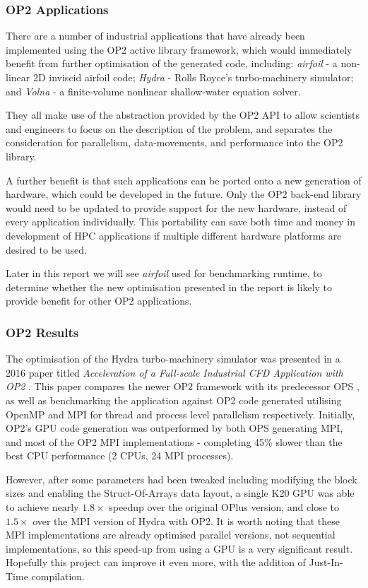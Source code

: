 \subsubsection{OP2 Applications}
There are a number of industrial applications that have already been implemented using the OP2 active library framework, which would immediately benefit from further optimisation of the generated code, including: \textit{airfoil} \cite{airfoil} - a non-linear 2D inviscid airfoil code; \textit{Hydra} \cite{hydra} - Rolls Royce’s turbo-machinery simulator; and \textit{Volna} \cite{volna} - a finite-volume nonlinear shallow-water equation solver.
\par
They all make use of the abstraction provided by the OP2 API to allow scientists and engineers to focus on the description of the problem, and separates the consideration for parallelism, data-movements, and performance into the OP2 library.
\par
A further benefit is that such applications can be ported onto a new generation of hardware, which could be developed in the future. Only the OP2 back-end library would need to be updated to provide support for the new hardware, instead of every application individually. This portability can save both time and money in development of HPC applications if multiple different hardware platforms are desired to be used.
\par
Later in this report we will see \textit{airfoil} used for benchmarking runtime, to determine whether the new optimisation presented in the report is likely to provide benefit for other OP2 applications.

\subsubsection{OP2 Results}
The optimisation of the Hydra turbo-machinery simulator was presented in a 2016 paper titled \textit{Acceleration of a Full-scale Industrial CFD Application with OP2} \cite{hydrapaper}. This paper compares the newer OP2 framework with its predecessor OPS \cite{ops}, as well as benchmarking the application against OP2 code generated utilising OpenMP \cite{OpenMP} and MPI \cite{MPI} for thread and process level parallelism respectively. Initially, OP2's GPU code generation was outperformed by both OPS generating MPI, and most of the OP2 MPI implementations - completing 45\% slower than the best CPU performance (2 CPUs, 24 MPI processes).
\par However, after some parameters had been tweaked including modifying the block sizes and enabling the Struct-Of-Arrays data layout, a single K20 GPU was able to achieve nearly $1.8\times$ speedup over the original OPlus version, and close to $1.5\times$ over the MPI version of Hydra with OP2. It is worth noting that these MPI implementations are already optimised parallel versions, not sequential implementations, so this speed-up from using a GPU is a very significant result. Hopefully this project can improve it even more, with the addition of Just-In-Time compilation.
\clearpage

